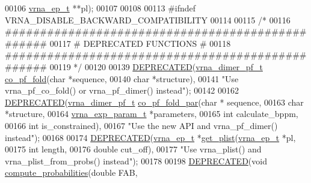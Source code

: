 \begin{DoxyCode}
00106                 \mbox{\hyperlink{group__struct__utils_structvrna__elem__prob__s}{vrna\_ep\_t}}   **pl);
00107 
00108 
00113 \textcolor{preprocessor}{#ifndef VRNA\_DISABLE\_BACKWARD\_COMPATIBILITY}
00114 
00115 \textcolor{comment}{/*}
00116 \textcolor{comment}{ #################################################}
00117 \textcolor{comment}{ # DEPRECATED FUNCTIONS                          #}
00118 \textcolor{comment}{ #################################################}
00119 \textcolor{comment}{ */}
00120 
00139 \mbox{\hyperlink{part__func__co_8h_aab347a3c03fbe8e7319551b9fa0cce4a}{DEPRECATED}}(\mbox{\hyperlink{group__pf__cofold_structvrna__dimer__pf__s}{vrna\_dimer\_pf\_t}} \mbox{\hyperlink{part__func__co_8h_ae5c1e7331718669bdae7a86de2be6184}{co\_pf\_fold}}(\textcolor{keywordtype}{char}  *sequence,
00140                                       \textcolor{keywordtype}{char}  *structure),
00141 \textcolor{stringliteral}{"Use vrna\_pf\_co\_fold() or vrna\_pf\_dimer() instead"});
00142 
00162 \mbox{\hyperlink{part__func__co_8h_aab347a3c03fbe8e7319551b9fa0cce4a}{DEPRECATED}}(\mbox{\hyperlink{group__pf__cofold_structvrna__dimer__pf__s}{vrna\_dimer\_pf\_t}} \mbox{\hyperlink{part__func__co_8h_aabfc6cb6d02b8f08ac4c92f4f5b125d9}{co\_pf\_fold\_par}}(\textcolor{keywordtype}{char}              *
      sequence,
00163                                           \textcolor{keywordtype}{char}              *structure,
00164                                           \mbox{\hyperlink{group__energy__parameters_structvrna__exp__param__s}{vrna\_exp\_param\_t}}  *parameters,
00165                                           \textcolor{keywordtype}{int}               calculate\_bppm,
00166                                           \textcolor{keywordtype}{int}               is\_constrained),
00167 \textcolor{stringliteral}{"Use the new API and vrna\_pf\_dimer() instead"});
00168 
00174 \mbox{\hyperlink{part__func__co_8h_aab347a3c03fbe8e7319551b9fa0cce4a}{DEPRECATED}}(\mbox{\hyperlink{group__struct__utils_structvrna__elem__prob__s}{vrna\_ep\_t}} *\mbox{\hyperlink{part__func__co_8h_afb35675f133966dc9f8a8c2c9686e13a}{get\_plist}}(\mbox{\hyperlink{group__struct__utils_structvrna__elem__prob__s}{vrna\_ep\_t}} *pl,
00175                                 \textcolor{keywordtype}{int}       length,
00176                                 \textcolor{keywordtype}{double}    cut\_off),
00177 \textcolor{stringliteral}{"Use vrna\_plist() and vrna\_plist\_from\_probs() instead"});
00178 
00198 \mbox{\hyperlink{part__func__co_8h_aab347a3c03fbe8e7319551b9fa0cce4a}{DEPRECATED}}(\textcolor{keywordtype}{void} \mbox{\hyperlink{part__func__co_8h_a94c19120130e66a667a10a3c8598550c}{compute\_probabilities}}(\textcolor{keywordtype}{double}    FAB,

\end{DoxyCode}
